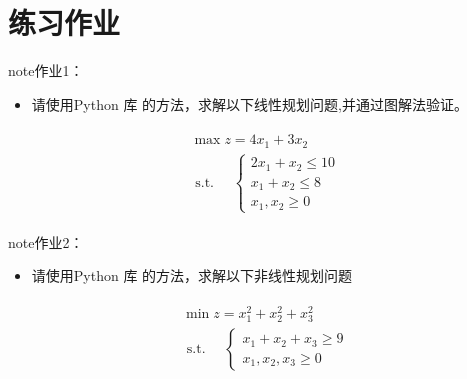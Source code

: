 \documentclass[letterpaper,10pt,english]{sphinxmanual}
\begin{document}
\section{练习作业}
\label{\detokenize{docs/LP:id15}}
\begin{sphinxadmonition}{note}{作业1：}
\begin{itemize}
\item {} 
请使用Python 库 的方法，求解以下线性规划问题,并通过图解法验证。

\end{itemize}
\begin{equation*}
\begin{split}
\begin{array}{l}
&{\max z= 4x_{1}+ 3x_{2}} \\
&\text { s.t. }{\quad\left\{\begin{array}{l}
{2x_{1}+ x_{2} \leq 10} \\ 
{x_{1}+ x_{2} \leq 8} \\ 
{x_{1}, x_{2} \geq 0}
\end{array}\right.}\end{array}
\end{split}
\end{equation*}\end{sphinxadmonition}

\begin{sphinxadmonition}{note}{作业2：}
\begin{itemize}
\item {} 
请使用Python 库 的方法，求解以下非线性规划问题

\end{itemize}
\begin{equation*}
\begin{split}
\begin{array}{l}
&{\min z= x_{1}^2 + x_{2}^2 +x_{3}^2} \\
&\text { s.t. }{\quad\left\{\begin{array}{l}
{x_1+x_2 + x_3\geq9 } \\ 
{ x_{1}, x_{2},x_3 \geq 0}
\end{array}\right.}\end{array}
\end{split}
\end{equation*}\end{sphinxadmonition}
\end{document}
